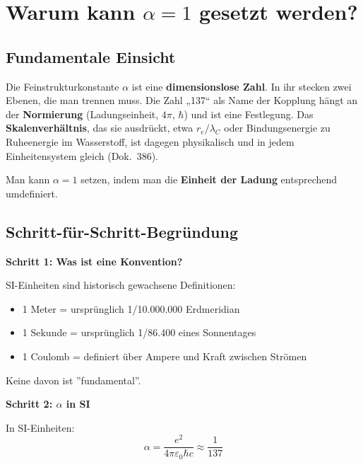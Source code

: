 	\section{Warum kann $\alpha = 1$ gesetzt werden?}
	
	\subsection{Fundamentale Einsicht}
	
	\begin{tcolorbox}[colback=blue!5!white,colframe=blue!75!black,title=Kernaussage]
		Die Feinstrukturkonstante $\alpha$ ist eine \textbf{dimensionslose Zahl}. In ihr stecken zwei Ebenen, die man trennen muss. Die Zahl „137“ als Name der Kopplung hängt an der \textbf{Normierung} (Ladungseinheit, $4\pi$, $\hbar$) und ist eine Festlegung. Das \textbf{Skalenverhältnis}, das sie ausdrückt, etwa $r_e/\lambda_C$ oder Bindungsenergie zu Ruheenergie im Wasserstoff, ist dagegen physikalisch und in jedem Einheitensystem gleich (Dok.~386).
		
		Man kann $\alpha = 1$ setzen, indem man die \textbf{Einheit der Ladung} entsprechend umdefiniert.
	\end{tcolorbox}
	
	\subsection{Schritt-für-Schritt-Begründung}
	
	\textbf{Schritt 1: Was ist eine Konvention?}
	
	SI-Einheiten sind historisch gewachsene Definitionen:
	\begin{itemize}
		\item 1 Meter = ursprünglich 1/10.000.000 Erdmeridian
		\item 1 Sekunde = ursprünglich 1/86.400 eines Sonnentages
		\item 1 Coulomb = definiert über Ampere und Kraft zwischen Strömen
	\end{itemize}
	
	Keine davon ist ''fundamental''.
	
	\textbf{Schritt 2: $\alpha$ in SI}
	
	In SI-Einheiten:
	\begin{equation}
		\alpha = \frac{e^2}{4\pi\varepsilon_0\hbar c} \approx \frac{1}{137}
	\end{equation}
	
